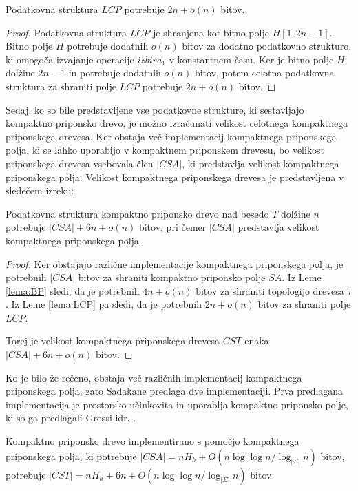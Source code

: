\begin{lema}\label{lema:LCP}
 Podatkovna struktura $LCP$ potrebuje $2n+o(n)$ bitov.
\end{lema}

\begin{proof}
    Podatkovna struktura $LCP$ je shranjena kot bitno polje $H[1,2n-1]$. Bitno polje $H$ potrebuje dodatnih $o(n)$ bitov za dodatno podatkovno strukturo, ki omogoča izvajanje operacije $izbira_1$ v konstantnem času. Ker je bitno polje $H$ dolžine $2n-1$ in potrebuje dodatnih $o(n)$ bitov, potem celotna podatkovna struktura za shraniti polje $LCP$ potrebuje $2n+o(n)$ bitov.
\end{proof}

Sedaj, ko so bile predstavljene vse podatkovne strukture, ki sestavljajo kompaktno priponsko drevo, je možno izračunati velikost celotnega kompaktnega priponskega drevesa. Ker obstaja več implementacij kompaktnega priponskega polja, ki se lahko uporabijo v kompaktnem priponskem drevesu, bo velikost priponskega drevesa vsebovala člen $|CSA|$, ki predstavlja velikost kompaktnega priponskega polja. Velikost kompaktnega priponskega drevesa je predstavljena v sledečem izreku:

\begin{izr}
    Podatkovna struktura kompaktno priponsko drevo nad besedo $T$ dolžine $n$ potrebuje $|CSA|+6n+o(n)$ bitov, pri čemer $|CSA|$ predstavlja velikost kompaktnega priponskega polja.
\end{izr}
\begin{proof}
    Ker obstajajo različne implementacije kompaktnega priponskega polja, je potrebnih $|CSA|$ bitov za shraniti kompaktno priponsko polje $SA$. Iz Leme \ref{lema:BP} sledi, da je potrebnih $4n+o(n)$ bitov za shraniti topologijo drevesa $\tau$. Iz Leme \ref{lema:LCP} pa sledi, da je potrebnih $2n+o(n)$ bitov za shraniti polje $LCP$.

    Torej je velikost kompaktnega priponskega drevesa $CST$ enaka $|CSA|+6n+o(n)$ bitov.
\end{proof}

Ko je bilo že rečeno, obstaja več različnih implementacij kompaktnega priponskega polja, zato Sadakane \cite{Sadakane2007} predlaga dve implementaciji. Prva predlagana implementacija je prostorsko učinkovita in uporablja kompaktno priponsko polje, ki so ga predlagali Grossi idr. \cite{Grossi2003}. 

\begin{posl}\label{pos:CSAnh}
Kompaktno priponsko drevo implementirano s pomočjo kompaktnega priponskega polja, ki potrebuje $|CSA|=nH_h+O(n\log\log{n} / \log_{| \Sigma|}{n})$ bitov, potrebuje $|CST|= nH_h+6n+O(n\log\log{n} / \log_{| \Sigma|}{n})$ bitov.    
\end{posl}

